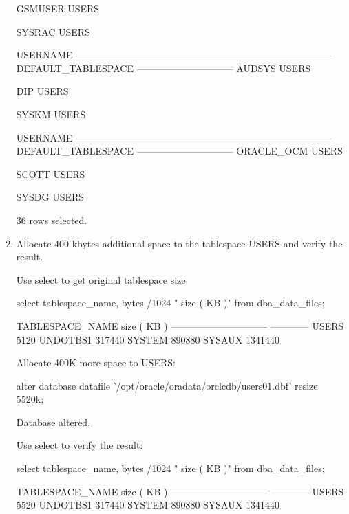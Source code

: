 \documentclass{article}
\begin{document}
\begin{enumerate}
\begin{messageshell}
GSMUSER
USERS

SYSRAC
USERS


USERNAME
--------------------------------------------------------------------------------
DEFAULT_TABLESPACE
------------------------------
AUDSYS
USERS

DIP
USERS

SYSKM
USERS


USERNAME
--------------------------------------------------------------------------------
DEFAULT_TABLESPACE
------------------------------
ORACLE_OCM
USERS

SCOTT
USERS

SYSDG
USERS


36 rows selected.

\end{messageshell}

\item{Allocate 400 kbytes additional space to the tablespace USERS and verify the result.}

Use select to get original tablespace size:
\begin{sqlshell}
select tablespace_name, bytes /1024  " size ( KB )" from dba_data_files; 
\end{sqlshell}
\begin{messageshell}
TABLESPACE_NAME         size ( KB )
------------------------------ ------------
USERS                       5120
UNDOTBS1                 317440
SYSTEM                     890880
SYSAUX                    1341440


\end{messageshell}

Allocate 400K more space to USERS:
\begin{sqlshell}
alter database datafile '/opt/oracle/oradata/orclcdb/users01.dbf' resize 5520k;
\end{sqlshell}
\begin{messageshell}

Database altered.

\end{messageshell}

Use select to verify the result:
\begin{sqlshell}
select tablespace_name, bytes /1024  " size ( KB )" from dba_data_files; %
\end{sqlshell}
\begin{messageshell}
TABLESPACE_NAME         size ( KB )
------------------------------ ------------
USERS                       5520
UNDOTBS1                 317440
SYSTEM                     890880
SYSAUX                    1341440


\end{messageshell}
\end{enumerate}
\end{document}
